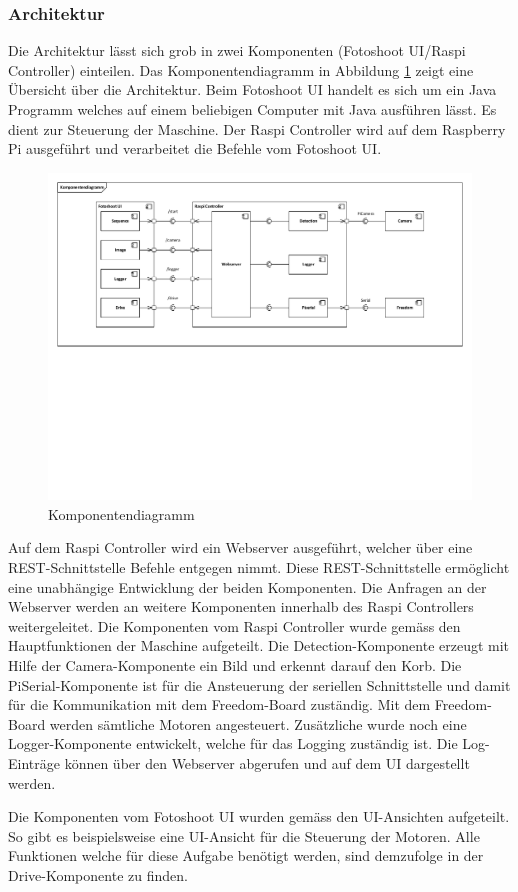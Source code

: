 \subsubsection{Architektur}

Die Architektur lässt sich grob in zwei Komponenten (Fotoshoot UI/Raspi Controller) einteilen. Das Komponentendiagramm in Abbildung \ref{fig:komponentendiagramm} zeigt eine Übersicht über die Architektur. Beim Fotoshoot UI handelt es sich um ein Java Programm welches auf einem beliebigen Computer mit Java ausführen lässt. Es dient zur Steuerung der Maschine. Der Raspi Controller wird auf dem Raspberry Pi ausgeführt und verarbeitet die Befehle vom Fotoshoot UI.

\begin{figure}[h!]
	\centering
	\includegraphics[width=\linewidth]{../../fig/komponentendiagramm}
	\caption{Komponentendiagramm}
	\label{fig:komponentendiagramm}
\end{figure}

Auf dem Raspi Controller wird ein Webserver ausgeführt, welcher über eine REST-Schnittstelle Befehle entgegen nimmt. Diese REST-Schnittstelle ermöglicht eine unabhängige Entwicklung der beiden Komponenten. Die Anfragen an der Webserver werden an weitere Komponenten innerhalb des Raspi Controllers weitergeleitet. Die Komponenten vom Raspi Controller wurde gemäss den Hauptfunktionen der Maschine aufgeteilt. Die Detection-Komponente erzeugt mit Hilfe der Camera-Komponente ein Bild und erkennt darauf den Korb. Die PiSerial-Komponente ist für die Ansteuerung der seriellen Schnittstelle und damit für die Kommunikation mit dem Freedom-Board zuständig. Mit dem Freedom-Board werden sämtliche Motoren angesteuert. Zusätzliche wurde noch eine Logger-Komponente entwickelt, welche für das Logging zuständig ist. Die Log-Einträge können über den Webserver abgerufen und auf dem UI dargestellt werden.

Die Komponenten vom Fotoshoot UI wurden gemäss den UI-Ansichten aufgeteilt. So gibt es beispielsweise eine UI-Ansicht für die Steuerung der Motoren. Alle Funktionen welche für diese Aufgabe benötigt werden, sind demzufolge in der Drive-Komponente zu finden.